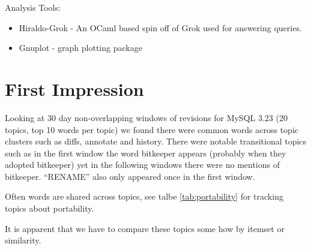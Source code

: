 \documentclass{report}
\begin{document}
Analysis Tools:
\begin{itemize}
\item Hiraldo-Grok - An OCaml based spin off of Grok used for
  answering queries.
\item Gnuplot - graph plotting package
\end{itemize}

\section{First Impression}


Looking at 30 day non-overlapping windows of revisions for MySQL 3.23
(20 topics, top 10 words per topic) we found there were common words
across topic clusters such as diffs, annotate and history. There were
notable transitional topics such as in the first window the word
bitkeeper appears (probably when they adopted bitkeeper) yet in the
following windows there were no mentions of bitkeeper. ``RENAME'' also
only appeared once in the first window.

Often words are shared across topics, see talbe \ref{tab:portability}
for tracking topics about portability.

It is apparent that we have to compare these topics some how by
itemset or similarity.
\end{document}

